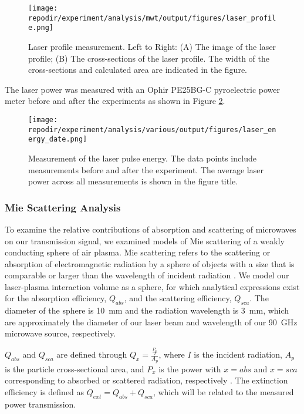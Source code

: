 \begin{figure}[H]
\centering
\texttt{[image: \\repodir/experiment/analysis/mwt/output/figures/laser\_profile.png]}
\caption{Laser profile measurement. Left to Right: (A) The image of the laser profile; (B) The cross-sections of the laser profile. The width of the cross-sections and calculated area are indicated in the figure.}
\label{fig:SI_Laser_Profile}
\end{figure}


The laser power was measured with an Ophir PE25BG-C pyroelectric power meter before and after the experiments as shown in Figure \ref{fig:SI_Laser_Energy}.



\begin{figure}[H]
\centering
\texttt{[image: \\repodir/experiment/analysis/various/output/figures/laser\_energy\_date.png]}
\caption{Measurement of the laser pulse energy. The data points include measurements before and after the experiment. The average laser power across all measurements is shown in the figure title. }
\label{fig:SI_Laser_Energy}
\end{figure}


\subsubsection{Mie Scattering Analysis}

To examine the relative contributions of absorption and scattering of microwaves on our transmission signal, we examined models of Mie scattering of a weakly conducting sphere of air plasma. Mie scattering refers to the scattering or absorption of electromagnetic radiation by a sphere of objects with a size that is comparable or larger than the wavelength of incident radiation \cite{bohrenAbsorptionScatteringLight2007}. We model our laser-plasma interaction volume as a sphere, for which analytical expressions exist for the absorption efficiency, $Q_{abs}$, and the scattering efficiency, $Q_{sca}$. The diameter of the sphere is \SI{10} {\milli\meter} and the radiation wavelength is \SI{3} {\milli\meter}, which are approximately the diameter of our laser beam and wavelength of our \SI{90} {\giga\hertz} microwave source, respectively.  %

$Q_{abs}$ and $Q_{sca}$ are defined through $Q_x = \frac{\frac{P_x}{I}}{A_p}$, where $I$ is the incident radiation, $A_p$ is the particle cross-sectional area, and $P_x$ is the power with $x=abs$ and $x=sca$ corresponding to absorbed or scattered radiation, respectively \cite{bohrenAbsorptionScatteringLight2007}. The extinction efficiency is defined as $Q_{ext} = Q_{abs} + Q_{sca}$, which will be related to the measured power transmission. %

